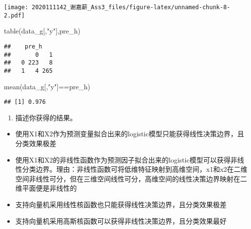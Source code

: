 \documentclass[
]{article}
\newenvironment{Shaded}{\begin{snugshade}}{\end{snugshade}}
\newcommand{\FunctionTok}[1]{\textcolor[rgb]{0.00,0.00,0.00}{#1}}
\newcommand{\NormalTok}[1]{#1}
\newcommand{\SpecialCharTok}[1]{\textcolor[rgb]{0.00,0.00,0.00}{#1}}
\newcommand{\StringTok}[1]{\textcolor[rgb]{0.31,0.60,0.02}{#1}}
\providecommand{\tightlist}{%
  \setlength{\itemsep}{0pt}\setlength{\parskip}{0pt}}
\begin{document}
\texttt{[image: 2020111142\_谢嘉薪\_Ass3\_files/figure-latex/unnamed-chunk-8-2.pdf]}

\begin{Shaded}
\begin{Highlighting}[]
\FunctionTok{table}\NormalTok{(data\_g[,}\StringTok{"y"}\NormalTok{],pre\_h)}
\end{Highlighting}
\end{Shaded}

\begin{verbatim}
##    pre_h
##       0   1
##   0 223   8
##   1   4 265
\end{verbatim}

\begin{Shaded}
\begin{Highlighting}[]
\FunctionTok{mean}\NormalTok{(data\_g[,}\StringTok{"y"}\NormalTok{]}\SpecialCharTok{==}\NormalTok{pre\_h)}
\end{Highlighting}
\end{Shaded}

\begin{verbatim}
## [1] 0.976
\end{verbatim}

\begin{enumerate}
\def\labelenumi{(\roman{enumi})}
\tightlist
\item
  描述你获得的结果。
\end{enumerate}

\begin{itemize}
\tightlist
\item
  使用X1和X2作为预测变量拟合出来的logistic模型只能获得线性决策边界，且分类效果极差
\item
  使用X1和X2的非线性函数作为预测因子拟合出来的logistic模型可以获得非线性分类边界。理由：非线性函数可将低维特征映射到高维空间，x1和x2在二维空间非线性可分，但在三维空间线性可分，高维空间的线性决策边界映射在二维平面便是非线性的
\item
  支持向量机采用线性核函数也只能获得线性决策边界，且分类效果极差
\item
  支持向量机采用高斯核函数可以获得非线性决策边界，且分类效果最好
\end{itemize}
\end{document}

